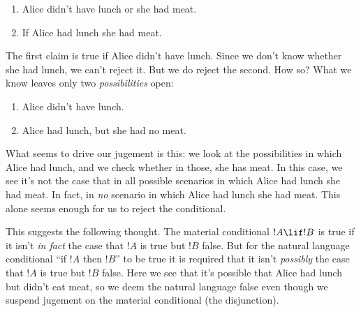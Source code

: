 \documentclass[../../../include/open-logic-section]{subfiles}
\begin{document}
\begin{enumerate}
	\item Alice didn't have lunch or she had meat.
	\item If Alice had lunch she had meat.
\end{enumerate}

The first claim is true if Alice didn't have lunch. Since we don't know whether she had lunch, we can't reject it. But we do reject the second. How so? What we know leaves only two \emph{possibilities} open:

\begin{enumerate}
	\item Alice didn't have lunch.
	\item Alice had lunch, but she had no meat. 
\end{enumerate}

What seems to drive our jugement is this: we look at the possibilities in which Alice had lunch, and we check whether in those, she has meat. In this case, we see it's not the case that in all possible scenarios in which Alice had lunch she had meat. In fact, in \emph{no} scenario in which Alice had lunch she had meat. This alone seems enough for us to reject the conditional.

This suggests the following thought. The material conditional $!A \lif !B$ is true if it isn't \emph{in fact} the case that $!A$ is true but $!B$ false. But for the natural language conditional ``if $!A$ then $!B$'' to be true it is required that it isn't \emph{possibly} the case that $!A$ is true but $!B$ false. Here we see that it's possible that Alice had lunch but didn't eat meat, so we deem the natural language false even though we suspend jugement on the material conditional (the disjunction).
\end{document}
